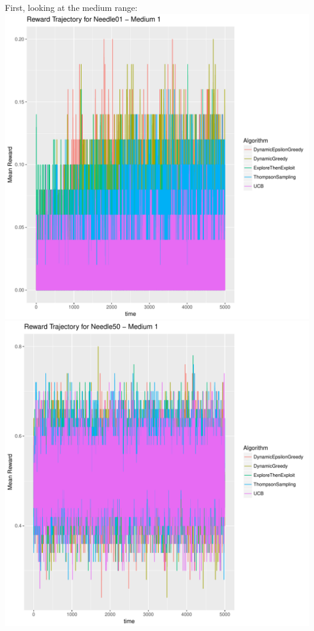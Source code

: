 \documentclass[11pt,letterpaper]{article}
\begin{document}
First, looking at the medium range: \\
\includegraphics[scale=0.5]{"../results/Reward Trajectory for Needle01 - Medium 1"} \\
\includegraphics[scale=0.5]{"../results/Reward Trajectory for Needle50 - Medium 1"} \\
\end{document}
